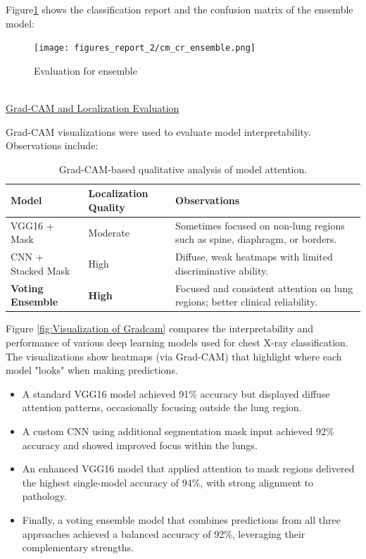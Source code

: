 \documentclass{article}
\begin{document}
Figure\ref{fig: Confusion matrix for ensemble} shows the classification report and the confusion matrix of the ensemble model:
\begin{figure}%
    \centering
    \texttt{[image: figures\_report\_2/cm\_cr\_ensemble.png]}
    \caption{Evaluation for ensemble}
    \label{fig: Confusion matrix for ensemble}
\end{figure}\\


\underline{Grad-CAM and Localization Evaluation}

Grad-CAM visualizations were used to evaluate model interpretability. Observations include:

\begin{table}[H]
\centering
\begin{tabular}{|l|l|p{8cm}|}
\hline
\textbf{Model} & \textbf{Localization Quality} & \textbf{Observations} \\
\hline
VGG16 + Mask & Moderate  & Sometimes focused on non-lung regions such as spine, diaphragm, or borders. \\
\hline
CNN + Stacked Mask & High  & Diffuse, weak heatmaps with limited discriminative ability. \\
\hline
\textbf{Voting Ensemble} & \textbf{High} & Focused and consistent attention on lung regions; better clinical reliability. \\
\hline
\end{tabular}
\caption{Grad-CAM-based qualitative analysis of model attention.}
\end{table}



Figure \ref{fig:Visualization of Gradcam} compares the interpretability and performance of various deep learning models used for chest X-ray classification. The visualizations show heatmaps (via Grad-CAM) that highlight where each model "looks" when making predictions.

\begin{itemize}
    \item A standard VGG16 model achieved 91\% accuracy but displayed diffuse attention patterns, occasionally focusing outside the lung region.
    \item A custom CNN using additional segmentation mask input achieved 92\% accuracy and showed improved focus within the lungs.
    \item An enhanced VGG16 model that applied attention to mask regions delivered the highest single-model accuracy of 94\%, with strong alignment to pathology.
     \item Finally, a voting ensemble model that combines predictions from all three approaches achieved a balanced accuracy of 92\%, leveraging their complementary strengths.
\end{itemize}
\end{document}
